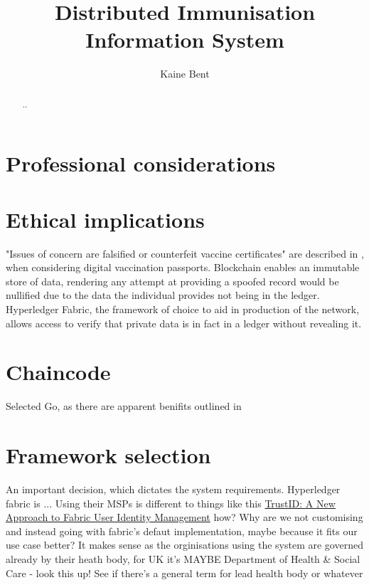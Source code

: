 \documentclass{report}
\title{Distributed Immunisation Information System}
\author{Kaine Bent}
\begin{document}
\begin{titlepage}
\maketitle
\end{titlepage}

\begin{abstract}
..
\end{abstract}

\begin{flushleft}

\chapter{Professional considerations}

\chapter{Ethical implications}
"Issues of concern are falsified or counterfeit vaccine certificates" are described in \cite{schlagenhauf_variants_2021}, when considering digital vaccination passports. 
Blockchain enables an immutable store of data, rendering any attempt at providing a spoofed record would be nullified due to the data the individual provides not being in the ledger.
Hyperledger Fabric, the framework of choice to aid in production of the network, allows access to verify that private data is in fact in a ledger without revealing it. %


\chapter{Chaincode}
Selected Go, as there are apparent benifits outlined in \cite{foschini_hyperledger_2020}

\chapter{Framework selection}
An important decision, which dictates the system requirements. Hyperledger fabric is ... Using their MSPs is different to things like this \href{'https://www.hyperledger.org/blog/2020/04/21/trustid-a-new-approach-to-fabric-user-identity-management'}{TrustID: A New Approach to Fabric User Identity Management} how? Why are we not customising and instead going with fabric's defaut implementation, maybe because it fits our use case better? It makes sense as the orginisations using the system are governed already by their heath body, for UK it's MAYBE Department of Health \& Social Care - look this up! See if there's a general term for lead health body or whatever


\end{flushleft}
\end{document}
